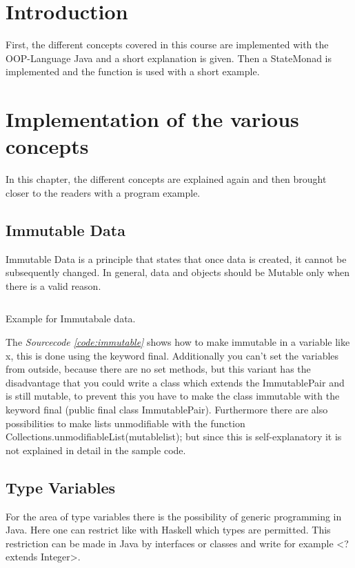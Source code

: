 \documentclass[a4paper,12pt,twoside]{scrreprt}
\begin{document}
\clearpage



\chapter{Introduction}
First, the different concepts covered in this course are implemented with the \ac{OOP}-Language Java and a short explanation is given. Then a StateMonad is implemented and the function is used with a short example.

\chapter{Implementation of the various concepts}
In this chapter, the different concepts are explained again and then brought closer to the readers with a program example.
\section{Immutable Data}
Immutable Data is a principle that states that once data is created, it cannot be subsequently changed. In general, data and objects should be Mutable only when there is a valid reason. 
\begin{listing}[ht]
    \inputminted[fontsize=\footnotesize,linenos]{java}{./code/ImmutablePair.java}
    \caption[Example for Immutabale data]{Example for Immutabale data.}
    \label{code:immutable}
\end{listing}
The \emph{Sourcecode \ref{code:immutable}} shows how to make immutable in a variable like x, this is done using the keyword final. Additionally you can't set the variables from outside, because there are no set methods, but this variant has the disadvantage that you could write a class which extends the ImmutablePair and is still mutable, to prevent this you have to make the class immutable with the keyword final (public final class ImmutablePair).
Furthermore there are also possibilities to make lists unmodifiable with the function Collections.unmodifiableList(mutablelist); but since this is self-explanatory it is not explained in detail in the sample code.
\section{Type Variables}
For the area of type variables there is the possibility of generic programming in Java. Here one can restrict like with Haskell which types are permitted. This restriction can be made in Java by interfaces or classes and write for example <? extends Integer>.
\end{document}

